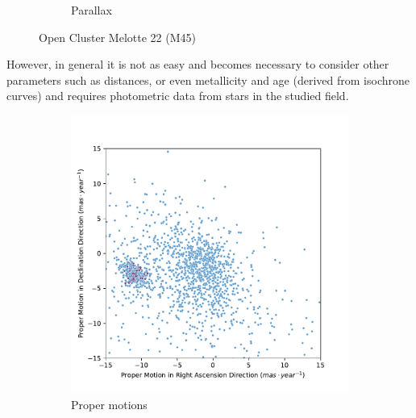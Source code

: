\documentclass[11pt, a4paper, english]{book}
\begin{document}
\begin{figure}[htbp]
\begin{subfigure}[t]{0.45\textwidth}
    \caption{Parallax}
    \label{fig:pm_vec_melotte_22}
  \end{subfigure}
  \caption{Open Cluster Melotte 22 (M45)}
\end{figure}

However, in general it is not as easy and becomes necessary to consider other parameters such as distances, or even
metallicity and age (derived from isochrone curves) and requires photometric data from stars in the studied field.

\begin{figure}[htbp]
  \centering
  \begin{subfigure}[t]{0.45\textwidth}
    \centering
    \includegraphics[width=\textwidth]{../figures/pm_ngc_2682.pdf}
    \caption{Proper motions}
    \label{fig:pm_ngc_2682}
  \end{subfigure}
  \hfill
  \begin{subfigure}[t]{0.45\textwidth}
    \centering

\end{subfigure}
\end{figure}
\end{document}

